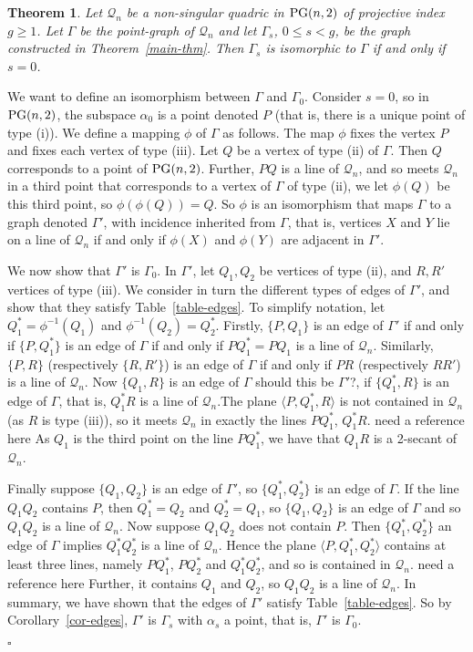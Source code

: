 \documentclass[12pt]{article}
\newtheorem{theorem}{Theorem}[section]
\newenvironment{proof}{\noindent{\bf Proof}\hspace{0.5em}}
    { \null  \hfill $\square$ \par}
\newcommand{\Q}{\mathscr Q}
\newcommand\PG{{\rm PG}}
\newcommand{\Label}{\label}
\newcommand\red[1]{{\color{red} #1}}
\begin{document}
\begin{theorem}\Label{thm:s0iso}  Let $\Q_n$ be a non-singular quadric in $\PG(n,2)$ of projective index $g\geq1$. Let $\Gamma$ be the point-graph of $\Q_n$ and let $\Gamma_s$, $0\leq s<g$,
 be the graph constructed in Theorem~\ref{main-thm}.
 Then $\Gamma_s$ is isomorphic to $\Gamma$ if and only if $s=0$.
\end{theorem}
\begin{proof} We want to define an isomorphism between $\Gamma$ and $\Gamma_0$. Consider $s=0$, so in $\PG(n,2)$, the  subspace $\alpha_0$ is a point denoted $P$ (that is, there is a unique point of type (i)). We define a mapping $\phi$  of $\Gamma$ as follows. The map $\phi$  fixes the vertex $P$ and   fixes each vertex  of type (iii). Let $Q$ be a vertex of type (ii) of $\Gamma$. Then $Q$ corresponds to a point of $\PG(n,2)$. Further, $PQ$ is a line of $\Q_n$, and so meets $\Q_n$ in a third point  that corresponds to a vertex of $\Gamma$ of type (ii), we let  $\phi(Q)$ be this third point, \red{so $\phi(\phi(Q))=Q$.} 
So $\phi$ is an isomorphism that maps $\Gamma$ to a graph denoted $\Gamma'$, \red{with incidence inherited from $\Gamma$, that is, vertices $X$ and $Y$ lie on a line of $\Q_n$ if and only if $\phi(X)$ and $\phi(Y)$ are adjacent in $\Gamma'$.}

We now show that $\Gamma'$ is $\Gamma_0$. In $\Gamma'$, 
let  $Q_1,Q_2$ be vertices  of type (ii), and $R,R'$  vertices   of type (iii). We consider in turn  the different types of edges of $\Gamma'$, and show that they satisfy Table~\ref{table-edges}.
To simplify notation, let $Q_1^*=\phi^{-1}(Q_1)$ and  $\phi^{-1}(Q_2)=Q_2^*$. Firstly, $\{P,Q_1\}$ is an edge of $\Gamma'$  if and only if $\{P,Q_1^*\}$ is an edge of $\Gamma$ if and only if $PQ_1^*=PQ_1$ is a line of $\Q_n$.
Similarly, $\{P,R\}$ (respectively $\{R,R'\}$) is  an edge of $\Gamma$ if and only if $PR$  (respectively $RR'$) is a line of $\Q_n$.
Now $\{Q_1,R\}$ is an edge of $\Gamma$ \red{should this be $\Gamma'$?}, if $\{Q_1^*,R\}$ is an edge of $\Gamma$, that is, 
$Q_1^*R$ is a line of $\Q_n$.The plane $\langle P,Q_1^*,R\rangle$ is not contained in $\Q_n$ (as $R$ is type (iii)), so it meets $\Q_n$ in exactly the lines $PQ_1^*$, $Q_1^*R$.\red{need a reference here}
As $Q_1$ is the third point on the line $PQ_1^*$, we have that 
 $Q_1R$ is a 2-secant of $\Q_n$. 

Finally suppose $\{Q_1,Q_2\}$ is an edge of $\Gamma'$, so $\{Q_1^*,Q_2^*\}$ is an edge of $\Gamma$. If the line $Q_1Q_2$ contains $P$, then $Q_1^*=Q_2$ and $Q_2^*=Q_1$, so $\{Q_1,Q_2\}$ is an edge of $\Gamma$ and so $Q_1Q_2$ is a line of $\Q_n$. Now suppose $Q_1Q_2$ does not contain $P$. Then 
$\{Q_1^*,Q_2^*\}$ an edge of $\Gamma$ implies $Q_1^*Q_2^*$ is a line of $\Q_n$. Hence the plane 
$\langle P,Q_1^*,Q_2^*\rangle$ contains at least three lines, namely $PQ_1^*$, $PQ_2^*$ and $Q_1^*Q_2^*$, and so is contained in  $\Q_n$. \red{need a reference here} Further, it contains  $Q_1$ and $Q_2$, so $Q_1Q_2$ is a line of $\Q_n$. In summary, we have shown that the edges of $\Gamma'$ satisfy Table~\ref{table-edges}. So by Corollary~\ref{cor-edges}, $\Gamma'$ is $\Gamma_s$ with $\alpha_s$ a point, that is,  $\Gamma'$ is $\Gamma_0$. 



\end{proof}
\end{document}

